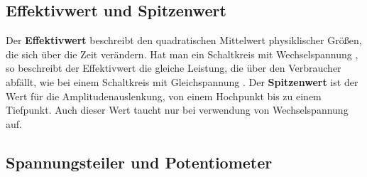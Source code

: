         \subsection{Effektivwert und Spitzenwert}
            Der \textbf{Effektivwert} beschreibt den quadratischen Mittelwert physiklischer Größen, die sich über die Zeit verändern. Hat man ein Schaltkreis mit Wechselspannung , so beschreibt der Effektivwert die gleiche Leistung, die über den Verbraucher abfällt, wie bei einem Schaltkreis mit Gleichspannung .
            Der \textbf{Spitzenwert} ist der Wert für die Amplitudenauslenkung, von einem Hochpunkt bis zu einem Tiefpunkt. Auch dieser Wert taucht nur bei verwendung von Wechselspannung auf. 

        \subsection{Spannungsteiler und Potentiometer}
